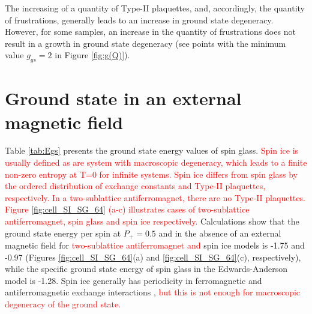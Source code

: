 \documentclass[preprint,12pt]{elsarticle}
\begin{document}
	The increasing of a quantity of Type-II plaquettes, and, accordingly, the quantity of frustrations, generally leads to an increase in ground state degeneracy. However, for some samples, an increase in the quantity of frustrations does not result in a growth in ground state degeneracy (see points with the minimum value $g_{gs}=2$ in Figure \ref{fig:g(Q)}). 
	
	\section{Ground state in an external magnetic field}
	
	Table \ref{tab:Egs} presents the ground state energy values of spin glass. \textcolor{red}{Spin ice is usually defined as are system with macroscopic degeneracy, which leads to a finite non-zero entropy at T=0 for infinite systems. Spin ice differs from spin glass by the ordered distribution of exchange constants and Type-II plaquettes, respectively. In a two-sublattice antiferromagnet, there are no Type-II plaquettes. Figure \ref{fig:cell_SI_SG_64} (a-c) illustrates cases of two-sublattice antiferromagnet, spin glass and spin ice respectively.} Calculations show that the ground state energy per spin at $P_+ = 0.5$ and in the absence of an external magnetic field for \textcolor{red}{two-sublattice antiferromagnet and} spin ice models is -1.75 and -0.97 (Figures \ref{fig:cell_SI_SG_64}(a) and \ref{fig:cell_SI_SG_64}(c), respectively), while the specific ground state energy of spin glass in the Edwards-Anderson model is -1.28. Spin ice generally has periodicity in ferromagnetic and antiferromagnetic exchange interactions \cite{peretyatko2017interplay, otsuka2018husimi, andriushchenko2019large, shevchenko2017effect, kato2022flux}, \textcolor{red}{but this is not enough for macroscopic degeneracy of the ground state.} 
	
\end{document}
